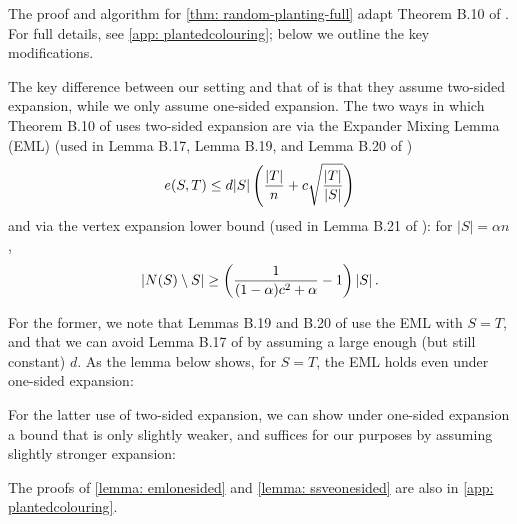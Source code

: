 The proof and algorithm for \cref{thm: random-planting-full} adapt Theorem B.10 of \cite{MR3536556-David16}. For full details, see \cref{app: plantedcolouring}; below we outline the key modifications.


The key difference between our setting and that of \cite{MR3536556-David16} is that they assume two-sided expansion, while we only assume one-sided expansion.
The two ways in which Theorem B.10 of \cite{MR3536556-David16} uses two-sided expansion are via the Expander Mixing Lemma (EML) (used in Lemma B.17, Lemma B.19, and Lemma B.20 of \cite{MR3536556-David16})
$$e(S, T)\leq d|S|\left(\frac{|T|}{n}+c\sqrt{\frac{|T|}{|S|}}\right)$$
and via the vertex expansion lower bound (used in Lemma B.21 of \cite{MR3536556-David16}): for $|S|=\alpha n$, 
$$\left\lvert N(S)\setminus S\right\rvert\geq \left(\frac{1}{(1-\alpha)c^2+\alpha}-1\right)|S|\,.$$

For the former, we note that Lemmas B.19 and B.20 of \cite{MR3536556-David16} use the EML with $S=T$, and that we can avoid Lemma B.17 of \cite{MR3536556-David16} by assuming a large enough (but still constant) $d$. As the lemma below shows, for $S=T$, the EML holds even under one-sided expansion:


For the latter use of two-sided expansion, we can show under one-sided expansion a bound that is only slightly weaker, and suffices for our purposes by assuming slightly stronger expansion:


The proofs of \cref{lemma: emlonesided} and \cref{lemma: ssveonesided} are also in \cref{app: plantedcolouring}.

